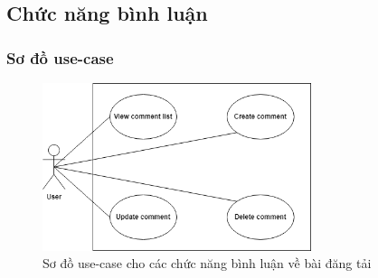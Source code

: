 \subsection{Chức năng bình luận}
\subsubsection{Sơ đồ use-case}
\begin{figure}[H]
    \centering
    \includegraphics[width=0.7\textwidth]{Images/UseCase/Comment.png}
    \caption{Sơ đồ use-case cho các chức năng bình luận về bài đăng tải}
\end{figure}
